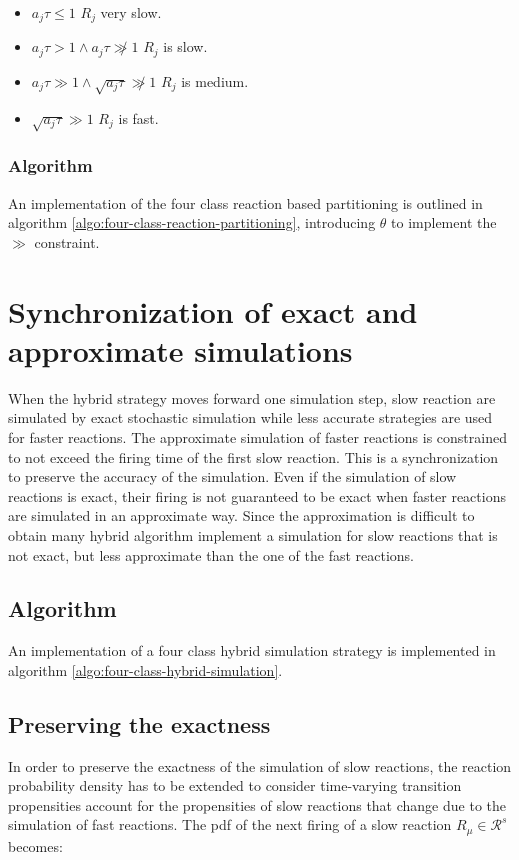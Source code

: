   \begin{itemize}
    \item $a_j\tau\le 1$ $R_j$ very slow.
    \item $a_j\tau > 1\land a_j\tau\not\gg 1$ $R_j$ is slow.
    \item $a_j\tau\gg 1\land\sqrt{a_j\tau}\not\gg 1$ $R_j$ is medium.
    \item $\sqrt{a_j\tau}\gg 1$ $R_j$ is fast.
  \end{itemize}

    \subsubsection{Algorithm}
    An implementation of the four class reaction based partitioning is outlined in algorithm \ref{algo:four-class-reaction-partitioning}, introducing $\theta$ to implement the $\gg$ constraint.

    

\section{Synchronization of exact and approximate simulations}
When the hybrid strategy moves forward one simulation step, slow reaction are simulated by exact stochastic simulation while less accurate strategies are used for faster reactions.
The approximate simulation of faster reactions is constrained to not exceed the firing time of the first slow reaction.
This is a synchronization to preserve the accuracy of the simulation.
Even if the simulation of slow reactions is exact, their firing is not guaranteed to be exact when faster reactions are simulated in an approximate way.
Since the approximation is difficult to obtain many hybrid algorithm implement a simulation for slow reactions that is not exact, but less approximate than the one of the fast reactions.

  \subsection{Algorithm}
  An implementation of a four class hybrid simulation strategy is implemented in algorithm \ref{algo:four-class-hybrid-simulation}.

  

  \subsection{Preserving the exactness}
  In order to preserve the exactness of the simulation of slow reactions, the reaction probability density has to be extended to consider time-varying transition propensities account for the propensities of slow reactions that change due to the simulation of fast reactions.
  The pdf of the next firing of a slow reaction $R_\mu\in\mathcal{R}^s$ becomes:

